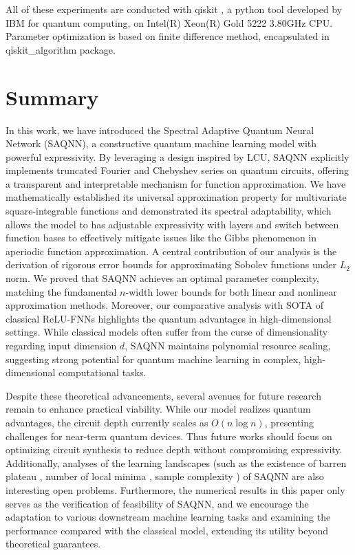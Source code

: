 \documentclass{article}
\theoremstyle{plain}
\theoremstyle{definition}
\theoremstyle{remark}
\begin{document}
All of these experiments are conducted with qiskit \cite{qiskit}, a python tool developed by IBM for quantum computing, on Intel(R) Xeon(R) Gold 5222 3.80GHz CPU. Parameter optimization is based on finite difference method, encapsulated in qiskit\_algorithm package.



\section{Summary}\label{sec5}
In this work, we have introduced the Spectral Adaptive Quantum Neural Network (SAQNN), a constructive quantum machine learning model with powerful expressivity. By leveraging a design inspired by LCU, SAQNN explicitly implements truncated Fourier and Chebyshev series on quantum circuits, offering a transparent and interpretable mechanism for function approximation. We have mathematically established its universal approximation property for multivariate square-integrable functions and demonstrated its spectral adaptability, which allows the model to has adjustable expressivity with layers and switch between function bases to effectively mitigate issues like the Gibbs phenomenon in aperiodic function approximation. A central contribution of our analysis is the derivation of rigorous error bounds for approximating Sobolev functions under $L_2$ norm. We proved that SAQNN achieves an optimal parameter complexity, matching the fundamental $n$-width lower bounds for both linear and nonlinear approximation methods. Moreover, our comparative analysis with SOTA of classical ReLU-FNNs highlights the quantum advantages in high-dimensional settings. While classical models often suffer from the curse of dimensionality regarding input dimension $d$, SAQNN maintains polynomial resource scaling, suggesting strong potential for quantum machine learning in complex, high-dimensional computational tasks. 

Despite these theoretical advancements, several avenues for future research remain to enhance practical viability. 
%
While our model realizes quantum advantages, the circuit depth currently scales as $O(n \log n)$, presenting challenges for near-term quantum devices. Thus future works should focus on optimizing circuit synthesis to reduce depth without compromising expressivity. 
%
Additionally, analyses of the learning landscapes (such as the existence of barren plateau \cite{mcclean2018,holmes2022}, number of local minima \cite{bittel2021,larocca2023}, sample complexity \cite{Huang2021,cai2022}) of SAQNN are also interesting open problems. 
%
Furthermore, the numerical results in this paper only serves as the verification of feasibility of SAQNN, and we encourage the adaptation to various downstream machine learning tasks and examining the performance compared with the classical model, extending its utility beyond theoretical guarantees. 
\end{document}
